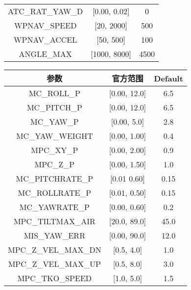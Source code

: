 \begin{table*}[htb]
\begin{minipage}{0.49\linewidth}
\begin{tabular}{ccc}
         ATC\_RAT\_YAW\_D & [0.00, 0.02] & 0 \\
         
         WPNAV\_SPEED & [20, 2000] & 500 \\
       
          WPNAV\_ACCEL & [50, 500]& 100 \\
       
       ANGLE\_MAX & [1000, 8000] & 4500 \\
        \bottomrule[1.5pt]
\end{tabular}
\end{minipage}
\begin{minipage}{0.49\linewidth}
\small
\caption{用于实验的PX4控制程序的参数}
\label{tab:range_paramall_px4}
\centering
\begin{tabular}{ccc}
        \toprule[1.5pt]
          参数 & 官方范围 & Default \\
        \midrule[0.8pt]
         MC\_ROLL\_P & [0.00, 12.0] & 6.5 \\
       
         MC\_PITCH\_P & [0.00, 12.0] & 6.5 \\ 
       
         MC\_YAW\_P & [0.00, 5.0] & 2.8 \\ 
        
         MC\_YAW\_WEIGHT & [0.00, 1.00] & 0.4 \\ 
        
         MPC\_XY\_P & [0.00, 2.00] & 0.9 \\ 
        
         MPC\_Z\_P & [0.00, 1.50] & 1.0 \\ 
        
         MC\_PITCHRATE\_P & [0.01 0.60] & 0.15 \\ 
        
         MC\_ROLLRATE\_P & [0.01, 0.50] & 0.15  \\ 
        
         MC\_YAWRATE\_P & [0.00, 0.60] & 0.2 \\ 
        
         MPC\_TILTMAX\_AIR & [20.0, 89.0] & 45.0 \\ 
        
         MIS\_YAW\_ERR & [0.00, 90.0] & 12.0 \\
        
         MPC\_Z\_VEL\_MAX\_DN & [0.5, 4.0] & 1.0 \\
        
         MPC\_Z\_VEL\_MAX\_UP & [0.5, 8.0] & 3.0 \\
        
         MPC\_TKO\_SPEED & [1.0, 5.0] & 1.5  \\
        
        \bottomrule[1.5pt]
\end{tabular}
\end{minipage}
\end{table*}